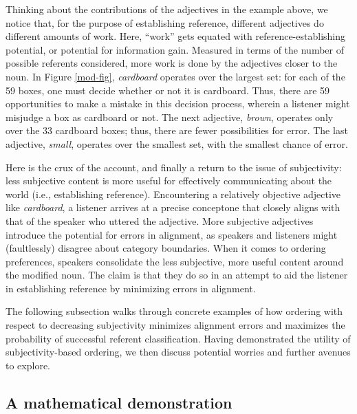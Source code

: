 \documentclass{sp}
\begin{document}
Thinking about the contributions of the adjectives in the example above, we notice that, for the purpose of establishing reference, different adjectives do different amounts of work. Here, ``work'' gets equated with reference-establishing potential, or potential for information gain. Measured in terms of the number of possible referents considered, more work is done by the adjectives closer to the noun. In Figure \ref{mod-fig}, %
\emph{cardboard} operates over the largest set: for each of the 59 boxes, one must decide whether or not it is cardboard. Thus, there are 59 opportunities to make a mistake in this decision process, wherein a listener might misjudge a box as cardboard or not. The next adjective, \emph{brown}, operates only over the 33 cardboard boxes; thus, there are fewer possibilities for error. The last adjective, \emph{small}, operates over the smallest set, with the smallest chance of error.

Here is the crux of the account, and finally a return to the issue of subjectivity: less subjective content is more useful for effectively communicating about the world (i.e., establishing reference). 
Encountering a relatively objective adjective like \emph{cardboard}, a listener arrives at a precise concept\dash one that closely aligns with that of the speaker who uttered the adjective. More subjective adjectives introduce the potential for errors in alignment, as speakers and listeners might (faultlessly) disagree about category boundaries. When it comes to ordering preferences, speakers consolidate the less subjective, more useful content around the modified noun. The claim is that they do so in an attempt to aid the listener in establishing reference by minimizing errors in alignment. 

The following subsection walks through concrete examples of how ordering with respect to decreasing subjectivity minimizes alignment errors and maximizes the probability of successful referent classification. Having demonstrated the utility of subjectivity-based ordering, we then discuss potential worries and further avenues to explore.

\subsection{A mathematical demonstration}
\end{document}

